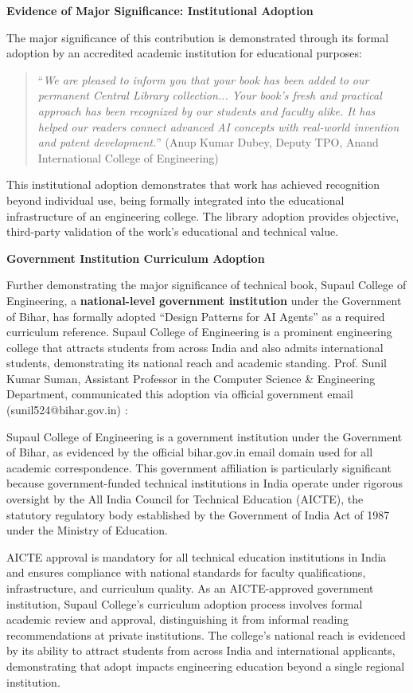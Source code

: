 \textbf{Evidence of Major Significance: Institutional Adoption}

The major significance of this contribution is demonstrated through its formal adoption by an accredited academic institution for educational purposes:

\begin{quote}
``\textit{We are pleased to inform you that your book has been added to our permanent Central Library collection... Your book's fresh and practical approach has been recognized by our students and faculty alike. It has helped our readers connect advanced AI concepts with real-world invention and patent development.}'' (Anup Kumar Dubey, Deputy TPO, Anand International College of Engineering) \cite{OR2}
\end{quote}

This institutional adoption demonstrates that \drs work has achieved recognition beyond individual use, being formally integrated into the educational infrastructure of an engineering college. The library adoption provides objective, third-party validation of the work's educational and technical value.

\textbf{Government Institution Curriculum Adoption}

Further demonstrating the major significance of \drs technical book, Supaul College of Engineering, a {\textbf{national-level government institution}} under the Government of Bihar, has formally adopted ``Design Patterns for AI Agents'' as a required curriculum reference. Supaul College of Engineering is a prominent engineering college that attracts students from across India and also admits international students, demonstrating its national reach and academic standing. Prof. Sunil Kumar Suman, Assistant Professor in the Computer Science \& Engineering Department, communicated this adoption via official government email (sunil524@bihar.gov.in) \cite{OR9}:

Supaul College of Engineering is a government institution under the Government of Bihar, as evidenced by the official bihar.gov.in email domain used for all academic correspondence. This government affiliation is particularly significant because government-funded technical institutions in India operate under rigorous oversight by the All India Council for Technical Education (AICTE), the statutory regulatory body established by the Government of India Act of 1987 under the Ministry of Education.

AICTE approval is mandatory for all technical education institutions in India and ensures compliance with national standards for faculty qualifications, infrastructure, and curriculum quality. As an AICTE-approved government institution, Supaul College's curriculum adoption process involves formal academic review and approval, distinguishing it from informal reading recommendations at private institutions. The college's national reach is evidenced by its ability to attract students from across India and international applicants, demonstrating that adopt impacts engineering education beyond a single regional institution.

